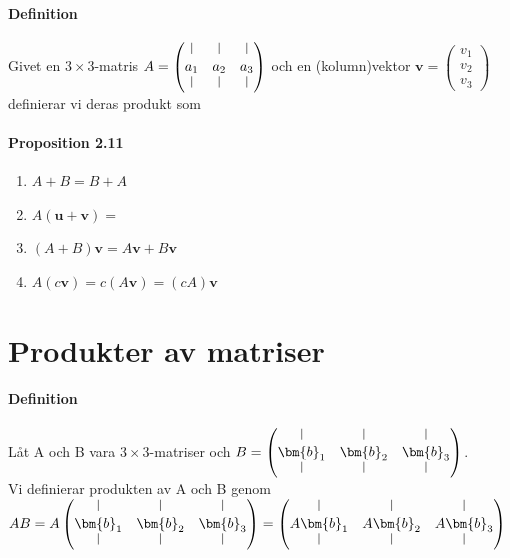\paragraph{Definition} Givet en $3\times 3$-matris $A=\begin{pmatrix}
    \line(0,1){8}&\line(0,1){8}&\line(0,1){8}\\
    a_{1}&a_{2}&a_{3}\\
    \line(0,1){8}&\line(0,1){8}&\line(0,1){8}
\end{pmatrix}$ och en (kolumn)vektor $\bm{v}=\begin{pmatrix}v_{1}\\v_{2}\\v_{3}\end{pmatrix}$ definierar vi deras
produkt som  %

\paragraph{Proposition 2.11} 
\begin{enumerate}
    \item $A+B=B+A$
    \item $A(\bm{u}+\bm{v})=$
    \item $(A+B)\bm{v}=A\bm{v}+B\bm{v}$
    \item $A(c\bm{v})=c(A\bm{v})=(cA)\bm{v}$
\end{enumerate}
\section{Produkter av matriser}
\paragraph{Definition} Låt A och B vara $3\times 3$-matriser och $B=\begin{pmatrix}
    \line(0,1){8}&\line(0,1){8}&\line(0,1){8}\\
    \bm{b}_{1}&\bm{b}_{2}&\bm{b}_{3}\\
    \line(0,1){8}&\line(0,1){8}&\line(0,1){8}
\end{pmatrix}$.\\
Vi definierar produkten av A och B genom $AB=A\begin{pmatrix}
    \line(0,1){8}&\line(0,1){8}&\line(0,1){8}\\
    \bm{b}_{1}&\bm{b}_{2}&\bm{b}_{3}\\
    \line(0,1){8}&\line(0,1){8}&\line(0,1){8}
\end{pmatrix}=\begin{pmatrix}
    \line(0,1){8}&\line(0,1){8}&\line(0,1){8}\\
    A\bm{b}_{1}&A\bm{b}_{2}&A\bm{b}_{3}\\
    \line(0,1){8}&\line(0,1){8}&\line(0,1){8}
\end{pmatrix}$


